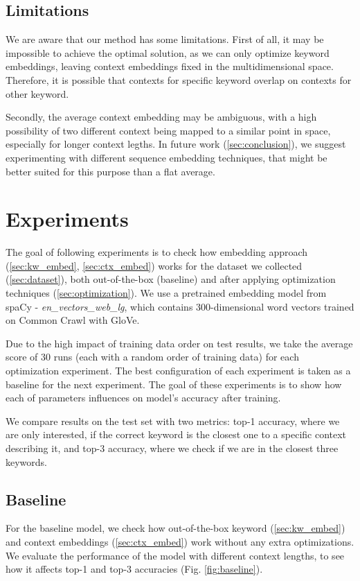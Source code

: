 \documentclass{llncs}
\begin{document}
\subsection{Limitations}
\label{sec:limitations}
We are aware that our method has some limitations.
First of all, it may be impossible to achieve the optimal solution, as we can only optimize keyword embeddings, leaving context embeddings fixed in the multidimensional space.
Therefore, it is possible that contexts for specific keyword overlap on contexts for other keyword.

Secondly, the average context embedding may be ambiguous, with a high possibility of two different context being mapped to a similar point in space, especially for longer context legths.
In future work (\ref{sec:conclusion}), we suggest experimenting with different sequence embedding techniques, that might be better suited for this purpose than a flat average.


\section{Experiments}
The goal of following experiments is to check how embedding approach (\ref{sec:kw_embed}, \ref{sec:ctx_embed}) works for the dataset we collected (\ref{sec:dataset}), both out-of-the-box (baseline) and after applying optimization techniques (\ref{sec:optimization}).
We use a pretrained embedding model from spaCy - \textit{en\_vectors\_web\_lg}, which contains 300-dimensional word vectors trained on Common Crawl with GloVe\cite{spacymodel}.

Due to the high impact of training data order on test results, we take the average score of 30 runs (each with a random order of training data) for each optimization experiment.
The best configuration of each experiment is taken as a baseline for the next experiment.
The goal of these experiments is to show how each of parameters influences on model's accuracy after training.

We compare results on the test set with two metrics: top-1 accuracy, where we are only interested, if the correct keyword is the closest one to a specific context describing it, and top-3 accuracy, where we check if we are in the closest three keywords.

\subsection{Baseline}
\label{sec:baseline}
For the baseline model, we check how out-of-the-box keyword (\ref{sec:kw_embed}) and context embeddings (\ref{sec:ctx_embed}) work without any extra optimizations.
We evaluate the performance of the model with different context lengths, to see how it affects top-1 and top-3 accuracies (Fig. \ref{fig:baseline}).
\end{document}
